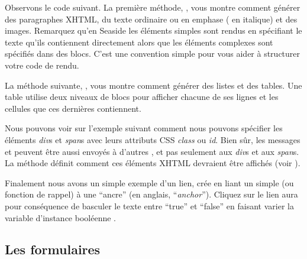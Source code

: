 \documentclass[a4paper,10pt,twoside]{book}
\begin{document}
Observons le code suivant.
La première méthode, , vous
montre comment générer des paragraphes XHTML, du texte ordinaire ou en
emphase (\ie{} en italique) et des images.
Remarquez qu'en Seaside les éléments simples sont rendus en spécifiant
le texte qu'ils contiennent directement alors que les éléments
complexes sont spécifiés dans des blocs.
C'est une convention simple pour vous aider à structurer votre code de
rendu.


La méthode suivante, ,
vous montre comment générer des listes et des tables.
Une table utilise deux niveaux de blocs pour afficher chacune
de ses lignes et les cellules que ces dernières contiennent.


Nous pouvons voir sur l'exemple suivant comment nous pouvons spécifier
les éléments \emph{div}s et \emph{span}s avec leurs attributs CSS
\emph{class} ou \emph{id}.
Bien sûr, les messages  et  peuvent être aussi
envoyés à d'autres \brushes, et pas seulement aux \emph{div}s et aux
\emph{span}s.
La méthode  définit comment ces éléments
XHTML devraient être affichés (voir ).


Finalement nous avons un simple exemple d'un lien, crée en liant un
simple  (ou fonction de rappel) à une
``ancre'' (en anglais, ``\emph{anchor}'').
Cliquez sur le lien aura pour conséquence de basculer le texte entre
``true'' et ``false'' en faisant varier la variable d'instance
booléenne .



\subsection{Les formulaires}
\end{document}

